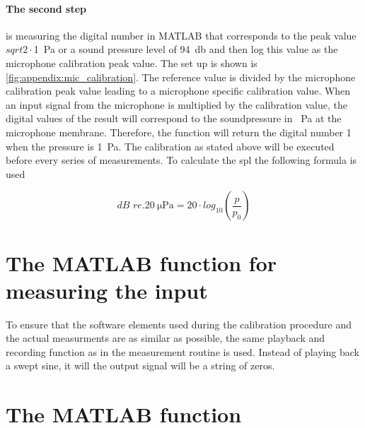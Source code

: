 \paragraph{The second step} is measuring the digital number in MATLAB that corresponds to the peak value \(sqrt{2}\cdot\)\SI{1}{\pascal} or a sound pressure level of \SI{94}{\decibel} and then log this value as the microphone calibration peak value. The set up is shown is \autoref{fig:appendix:mic_calibration}. The reference value is divided by the microphone calibration peak value leading to a microphone specific calibration value. When an input signal from the microphone is multiplied by the calibration value, the digital values of the result will correspond to the soundpressure in \SI{}{\pascal} at the microphone membrane.
Therefore, the function will return the digital number 1 when the pressure is \SI{1}{\pascal}. The calibration as stated above will be executed before every series of measurements. To calculate the \gls{spl} the following formula is used

\begin{equation}
dB\,\, re. \SI{20}{\micro\pascal} = 20 \cdot log_{10} \left ( \frac{p}{p_0} \right )
\end{equation}

    \startexplain
    \stopexplain  


\section*{The MATLAB function for measuring the input}
To ensure that the software elements used during the calibration procedure and the actual measurments are as similar as possible, the same playback and recording function as in the measurement routine is used. Instead of playing back a swept sine, it will the output signal will be a string of zeros.

\section*{The MATLAB function}



